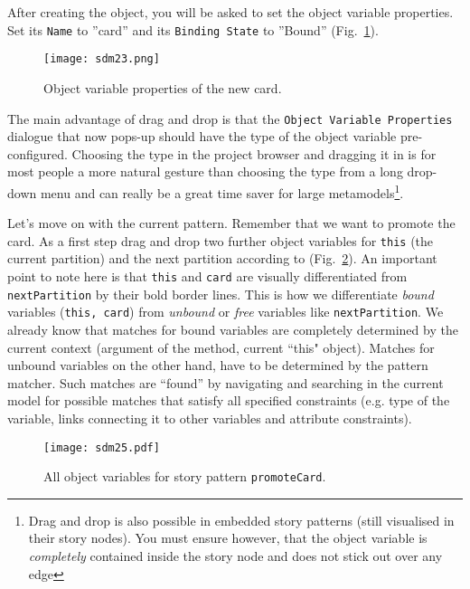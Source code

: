 After creating the object, you will be asked to set the object variable properties. Set its \texttt{Name} to ''card'' and its \texttt{Binding State} to
''Bound'' (Fig.~\ref{fig:sdm_new_card_properties}).

\begin{figure}[htbp]
\begin{center}
  \texttt{[image: sdm23.png]}
  \caption{Object variable properties of the new card.}
  \label{fig:sdm_new_card_properties}
\end{center}
\end{figure}

The main advantage of drag and drop is that the \texttt{Object Variable Pro\-per\-ties} dialogue that now pops-up should have the type of the object variable
pre-configured. Choosing the type in the project browser and dragging it in is for most people a more natural gesture than choosing the type from a long
drop-down menu and can really be a great time saver for large metamodels\footnote{Drag and drop is also possible in embedded story patterns (still visualised in
their story nodes).  You must ensure however, that the object variable is \emph{completely} contained inside the story node and does not stick out over any
edge}.

Let's move on with the current pattern. Remember that we want to promote the card. As a first step drag and drop two further object variables for \texttt{this}
(the current partition) and the next partition according to (Fig.~\ref{fig:sdm_check_complete_sp}). An important point to note here is that \texttt{this} and
\texttt{card} are visually differentiated from \texttt{nextPartition} by their bold border lines.
This is how we differentiate \emph{bound}  variables (\texttt{this, card}) from \emph{unbound} or \emph{free} variables like
\texttt{nextPartition}. We already know that matches for bound variables are completely determined by the current context (argument of the method, current
``this" object).
Matches for unbound variables on the other hand, have to be determined by the pattern matcher. Such matches are ``found'' by navigating and searching in the
current model for possible matches that satisfy all specified constraints (e.g. type of the variable, links connecting it to other variables and attribute
constraints).

\begin{figure}[htbp]
\begin{center}
  \texttt{[image: sdm25.pdf]}
  \caption{All object variables for story pattern \texttt{promoteCard}.}
  \label{fig:sdm_check_complete_sp}
\end{center}
\end{figure}

